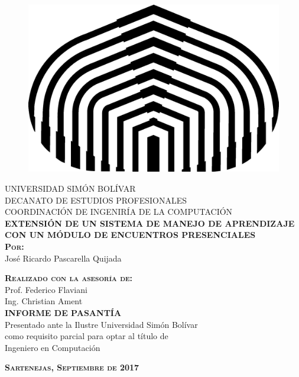\thispagestyle{empty} %
\begin{center}

\begin{figure}[h]
\begin{center}
\includegraphics{Logos/logoUSB.png}
\end{center}
\end{figure}

\textsc{UNIVERSIDAD SIMÓN BOLÍVAR}\\
\textsc{DECANATO DE ESTUDIOS PROFESIONALES}\\
\textsc{COORDINACIÓN DE INGENIRÍA DE LA COMPUTACIÓN}\\[8em]

\textsc{\Large \textbf{EXTENSIÓN DE UN SISTEMA DE MANEJO DE APRENDIZAJE CON UN MÓDULO DE ENCUENTROS PRESENCIALES}}\\[4em]

\textsc{ \textbf{Por:} }\\
José Ricardo Pascarella Quijada

\textsc{ \textbf{Realizado con la asesoría de:} }\\
Prof. Federico Flaviani \\
Ing. Christian Ament\\[4em]

\textsc{ \textbf{INFORME DE PASANTÍA} }\\
Presentado ante la Ilustre Universidad Simón Bolívar\\
como requisito parcial para optar al título de \\
Ingeniero en Computación

\vspace*{\fill}

\textsc{ \textbf{Sartenejas, Septiembre de 2017} }
\end{center}
